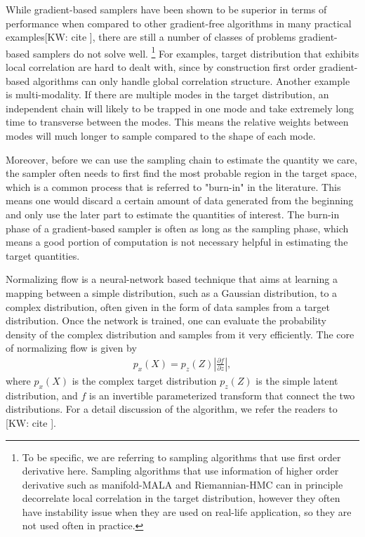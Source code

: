 \documentclass[twocolumn]{aastex631}
\newcommand{\kw}[1]{{\color{rb4}[KW: #1 ]}}
\begin{document}
While gradient-based samplers have been shown to be superior in terms of
performance when compared to other gradient-free algorithms in many practical
examples\kw{cite}, there are still a number of classes of problems
gradient-based samplers do not solve well. \footnote{To be specific, we are
referring to sampling algorithms that use first order derivative here. Sampling
algorithms that use information of higher order derivative such as manifold-MALA
and Riemannian-HMC can in principle decorrelate local correlation in the target
distribution, however they often have instability issue when they are used on
real-life application, so they are not used often in practice.} For examples,
target distribution that exhibits local correlation are hard to dealt with,
since by construction first order gradient-based algorithms can only handle
global correlation structure. Another example is multi-modality. If there are
multiple modes in the target distribution, an independent chain will likely to
be trapped in one mode and take extremely long time to transverse between the
modes. This means the relative weights between modes will much longer to sample
compared to the shape of each mode.

Moreover, before we can use the sampling chain to estimate the quantity we care,
the sampler often needs to first find the most probable region in the target
space, which is a common process that is referred to "burn-in" in the
literature. This means one would discard a certain amount of data generated from
the beginning and only use the later part to estimate the quantities of
interest. The burn-in phase of a gradient-based sampler is often as long as the
sampling phase, which means a good portion of computation is not necessary
helpful in estimating the target quantities.

Normalizing flow is a neural-network based technique that aims at learning a
mapping between a simple distribution, such as a Gaussian distribution, to a
complex distribution, often given in the form of data samples from a target
distribution. Once the network is trained, one can evaluate the probability
density of the complex distribution and samples from it very efficiently.
The core of normalizing flow is given by
\begin{align}
    p_x(X) = p_z(Z) \left| \frac{\partial f}{\partial z}\right|,
\end{align}
where $p_x(X)$ is the complex target distribution $p_z(Z)$ is the simple latent
distribution, and $f$ is an invertible parameterized transform that
connect the two distributions. For a detail discussion of the algorithm, we
refer the readers to \kw{cite}.
\end{document}
